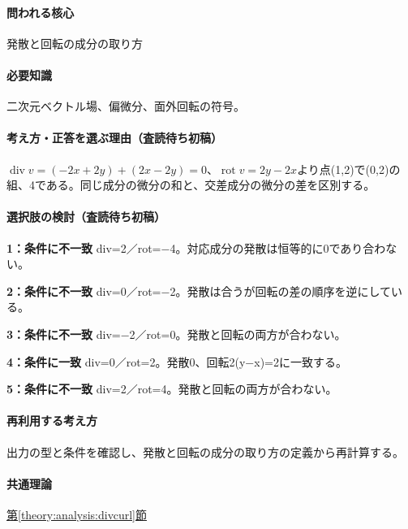 \paragraph{問われる核心} 発散と回転の成分の取り方

\paragraph{必要知識} 二次元ベクトル場、偏微分、面外回転の符号。

\paragraph{考え方・正答を選ぶ理由（査読待ち初稿）} \(\operatorname{div}v=(-2x+2y)+(2x-2y)=0\)、\(\operatorname{rot}v=2y-2x\)より点(1,2)で(0,2)の組、4である。同じ成分の微分の和と、交差成分の微分の差を区別する。

\paragraph{選択肢の検討（査読待ち初稿）}\mbox{}\par

\noindent\textbf{1：条件に不一致} div=\allowbreak{}2／rot=−4。対応成分の発散は恒等的に0であり合わない。\par

\noindent\textbf{2：条件に不一致} div=\allowbreak{}0／rot=−2。発散は合うが回転の差の順序を逆にしている。\par

\noindent\textbf{3：条件に不一致} div=−2／rot=\allowbreak{}0。発散と回転の両方が合わない。\par

\noindent\textbf{4：条件に一致} div=\allowbreak{}0／rot=\allowbreak{}2。発散0、回転2(y−x)=\allowbreak{}2に一致する。\par

\noindent\textbf{5：条件に不一致} div=\allowbreak{}2／rot=\allowbreak{}4。発散と回転の両方が合わない。\par

\paragraph{再利用する考え方} 出力の型と条件を確認し、発散と回転の成分の取り方の定義から再計算する。

\paragraph{共通理論} \hyperref[theory:analysis:divcurl]{第\ref*{theory:analysis:divcurl}節}

